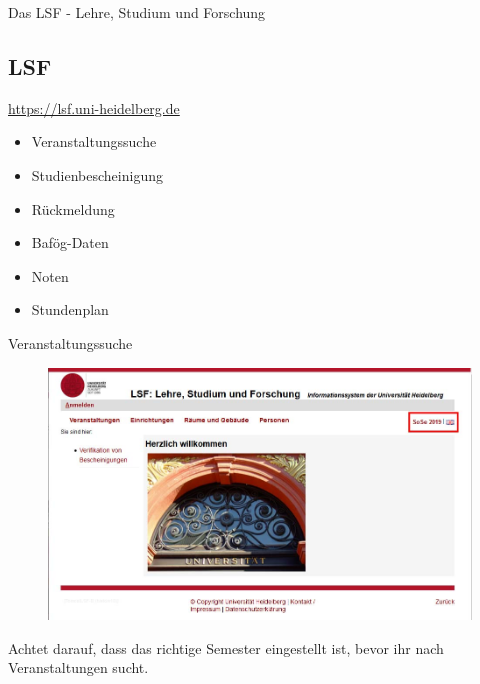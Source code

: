 \begin{frame}{Das LSF - Lehre, Studium und Forschung}
  \subsection{LSF}

  \url{https://lsf.uni-heidelberg.de}

  \begin{center}
  \end{center}

  \begin{itemize}
    \item{Veranstaltungssuche}
    \item{Studienbescheinigung}
    \item{Rückmeldung}
    \item{Bafög-Daten}
    \item{Noten}
    \item{Stundenplan}
  \end{itemize}
\end{frame}

\begin{frame}{Veranstaltungssuche}
  \begin{figure}
	   \centering
	   \includegraphics[scale=0.3]{images/lsf01.jpg}
  \end{figure}
Achtet darauf, dass das richtige Semester eingestellt ist, bevor ihr nach Veranstaltungen sucht.
\end{frame}

